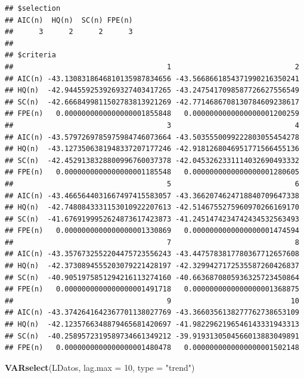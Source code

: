 \documentclass[
]{book}
\newenvironment{Shaded}{\begin{snugshade}}{\end{snugshade}}
\newcommand{\AttributeTok}[1]{\textcolor[rgb]{0.13,0.29,0.53}{#1}}
\newcommand{\DecValTok}[1]{\textcolor[rgb]{0.00,0.00,0.81}{#1}}
\newcommand{\FunctionTok}[1]{\textcolor[rgb]{0.13,0.29,0.53}{\textbf{#1}}}
\newcommand{\NormalTok}[1]{#1}
\newcommand{\StringTok}[1]{\textcolor[rgb]{0.31,0.60,0.02}{#1}}
\begin{document}
\begin{verbatim}
## $selection
## AIC(n)  HQ(n)  SC(n) FPE(n) 
##      3      2      2      3 
## 
## $criteria
##                                    1                             2
## AIC(n) -43.1308318646810135987834656 -43.5668661854371990216350241
## HQ(n)  -42.9445592539269327403417265 -43.2475417098587726627556549
## SC(n)  -42.6668499811502783813921269 -42.7714686708130784609238617
## FPE(n)   0.0000000000000000001855848   0.0000000000000000001200259
##                                    3                             4
## AIC(n) -43.5797269785975984746073664 -43.5035550099222803055454278
## HQ(n)  -43.1273506381948337207177246 -42.9181268046951771566455136
## SC(n)  -42.4529138328800996760037378 -42.0453262331114032690493332
## FPE(n)   0.0000000000000000001185548   0.0000000000000000001280605
##                                    5                             6
## AIC(n) -43.4665644031667497415583057 -43.3662074624718840709647338
## HQ(n)  -42.7480843331153010922207613 -42.5146755275960970266169170
## SC(n)  -41.6769199952624873617423873 -41.2451474234742434532563493
## FPE(n)   0.0000000000000000001330869   0.0000000000000000001474594
##                                    7                             8
## AIC(n) -43.3576732552204475723556243 -43.4475783817780367712657608
## HQ(n)  -42.3730894555203079221428197 -42.3299427172535587260426837
## SC(n)  -40.9051975851294216113274160 -40.6636870805936325723450864
## FPE(n)   0.0000000000000000001491718   0.0000000000000000001368875
##                                    9                            10
## AIC(n) -43.3742641642367701138027769 -43.3660356138277762738653109
## HQ(n)  -42.1235766348879465681420697 -41.9822962196546143331943313
## SC(n)  -40.2589572319589734661349212 -39.9193130504566013883049891
## FPE(n)   0.0000000000000000001480478   0.0000000000000000001502148
\end{verbatim}

\begin{Shaded}
\begin{Highlighting}[]
\FunctionTok{VARselect}\NormalTok{(LDatos, }\AttributeTok{lag.max =} \DecValTok{10}\NormalTok{, }\AttributeTok{type =} \StringTok{"trend"}\NormalTok{)}
\end{Highlighting}
\end{Shaded}
\end{document}
